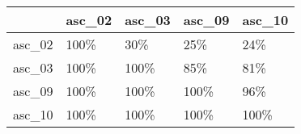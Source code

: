 \begin{tabular}{lllll}
\toprule
{} & asc\_02 & asc\_03 & asc\_09 & asc\_10 \\
\midrule
asc\_02 &   100\% &    30\% &    25\% &    24\% \\
asc\_03 &   100\% &   100\% &    85\% &    81\% \\
asc\_09 &   100\% &   100\% &   100\% &    96\% \\
asc\_10 &   100\% &   100\% &   100\% &   100\% \\
\bottomrule
\end{tabular}
